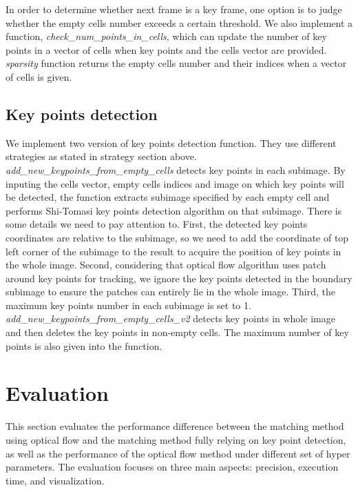 \documentclass{easychair}
\begin{document}
In order to determine whether next frame is a key frame, one option is to judge whether the empty cells number exceeds a certain threshold. We also implement a function, \emph{check\_num\_points\_in\_cells}, which can update the number of key points in a vector of cells when key points and the cells vector are provided.  \emph{sparsity} function returns the empty cells number and their indices when a vector of cells is given. \\

\subsection{Key points detection}
We implement two version of key points detection function. They use different strategies as stated in strategy section above. \\

\emph{add\_new\_keypoints\_from\_empty\_cells} detects key points in each subimage. By inputing the cells vector, empty cells indices and image on which key points will be detected, the function extracts subimage specified by each empty cell and performs Shi-Tomasi key points detection algorithm on that subimage. There is some details we need to pay attention to. First, the detected key points coordinates are relative to the subimage, so we need to add the coordinate of top left corner of the subimage to the result to acquire the position of key points in the whole image. Second, considering that optical flow algorithm uses patch around key points for tracking, we ignore the key points detected in the boundary subimage to ensure the patches can entirely lie in the whole image. Third, the maximum key points number in each subimage is set to 1.\\

\emph{add\_new\_keypoints\_from\_empty\_cells\_v2} detects key points in whole image and then deletes the key points in non-empty cells. The maximum number of key points is also given into the function.\\

\section{Evaluation}
This section evaluates the performance difference between the matching method using optical flow and the matching method fully relying on key point detection, as well as the performance of the optical flow method under different set of hyper parameters. The evaluation focuses on three main aspects: precision, execution time, and visualization.
\end{document}
